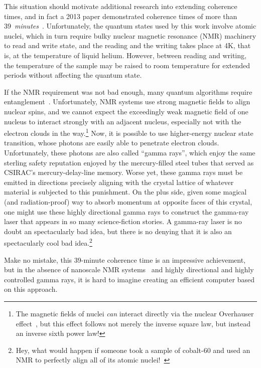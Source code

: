 This situation should motivate additional research into extending
coherence times, and in fact a 2013 paper demonstrated coherence
times of more than
39~\emph{minutes}~\cite{KamyarSaeedi2018QC-39-minutes}.
Unfortunately, the quantum states used by this work involve atomic nuclei,
which in turn require bulky nuclear magnetic resonance (NMR) machinery
to read and write state, and the reading and the writing takes place
at 4K, that is, at the temperature of liquid helium.
However, between reading and writing, the temperature of the sample may
be raised to room temperature for extended periods without affecting
the quantum state.

If the NMR requirement was not bad enough, many quantum algorithms require
entanglement~\cite{PeterWSchor2001QuantumAlgorithms}.
Unfortunately, NMR systems use strong magnetic fields to align
nuclear spins, and we cannot expect the exceedingly weak magnetic
field of one nucleus to interact strongly with an adjacent nucleus,
especially not with the electron clouds in the way.\footnote{
	The magnetic fields of nuclei \emph{can} interact directly
	via the nuclear Overhauser effect~\cite{PhysRev.92.411},
	but this effect follows not merely the inverse square law,
	but instead an inverse sixth power law!}
Now, it is possible to use higher-energy nuclear state transition,
whose photons are easily able to penetrate electron clouds.
Unfortunately, these photons are also called ``gamma rays'', which enjoy
the same sterling safety reputation enjoyed by the mercury-filled steel
tubes that served as CSIRAC's mercury-delay-line memory.
Worse yet, these gamma rays must be emitted in directions precisely
aligning with the crystal lattice of whatever material is subjected
to this punishment.
On the plus side, given some magical (and radiation-proof) way to absorb
momentum at opposite faces of this crystal, one might use these highly
directional gamma rays to construct the gamma-ray laser that appears in
so many science-fiction stories.
A gamma-ray laser is no doubt an spectacularly bad idea, but there is no
denying that it is also an spectacularly cool bad idea.\footnote{
	Hey, what would happen if someone took a sample of
	cobalt-60 and used an NMR to perfectly align all of its
	atomic nuclei!~\cite{1957PhRv..105.1413W}}

Make no mistake, this 39-minute coherence time is an impressive
achievement, but in the absence
of nanoscale NMR systems~\cite{HJMamin2013QC-nanoscale-NMR} and
highly directional and highly controlled gamma rays, it is
hard to imagine creating an efficient computer based on this approach.

